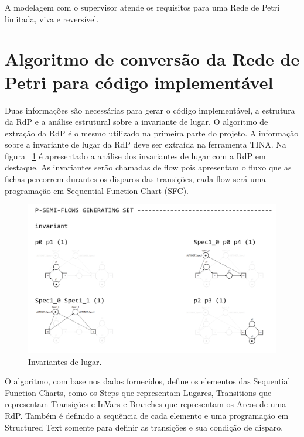 A modelagem com o supervisor atende os requisitos para uma Rede de Petri limitada, viva e revers\'ivel.

\section{Algoritmo de convers\~ao da Rede de Petri para c\'odigo implement\'avel}

Duas informa\c{c}\~oes s\~ao necess\'arias para gerar o c\'odigo implement\'avel, a estrutura da RdP e a an\'alise estrutural sobre a invariante de lugar. O algoritmo de extra\c{c}\~ao da RdP \'e o mesmo utilizado na primeira parte do projeto. A informa\c{c}\~ao sobre a invariante de lugar da RdP deve ser extra\'ida na ferramenta TINA. Na figura ~\ref{fig:pqnafabstruct} \'e apresentado a an\'alise dos invariantes de lugar com a RdP em destaque. As invariantes ser\~ao chamadas de flow pois apresentam o fluxo que as fichas percorrem durantes os disparos das transi\c{c}\~oes, cada flow ser\'a uma programa\c{c}\~ao em Sequential Function Chart (SFC).

\begin{figure}[!htb]
	\caption[Invariantes de lugar.]{Invariantes de lugar.}
	\label{fig:pqnafabstruct}
	\includegraphics[width=16cm]{./figuras/PQNAFABSTRUCT.png}\centering
\end{figure}

O algoritmo, com base nos dados fornecidos, define os elementos das Sequential Function Charts, como os Steps que representam Lugares, Transitions que representam Transi\c{c}\~oes e InVars e Branches que representam os Arcos de uma RdP. Tamb\'em \'e definido a sequ\^encia de cada elemento e uma programa\c{c}\~ao em Structured Text somente para definir as transi\c{c}\~oes e sua condi\c{c}\~ao de disparo.

